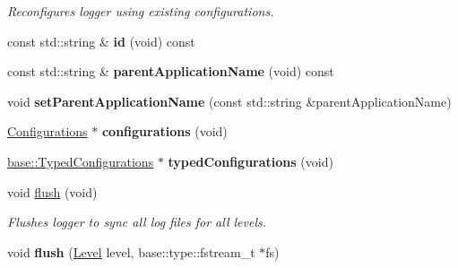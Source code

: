 \begin{DoxyCompactItemize}
\begin{DoxyCompactList}\small\item\em Reconfigures logger using existing configurations. \end{DoxyCompactList}\item 
const std\+::string \& {\bfseries id} (void) const \hypertarget{classel_1_1Logger_ae51a621df3c835f51f450134ba66f8ac}{}\label{classel_1_1Logger_ae51a621df3c835f51f450134ba66f8ac}

\item 
const std\+::string \& {\bfseries parent\+Application\+Name} (void) const \hypertarget{classel_1_1Logger_a9e56e468bccd7b52281e7bbc75892431}{}\label{classel_1_1Logger_a9e56e468bccd7b52281e7bbc75892431}

\item 
void {\bfseries set\+Parent\+Application\+Name} (const std\+::string \&parent\+Application\+Name)\hypertarget{classel_1_1Logger_a6890af8910adba26b01ef029429c4f15}{}\label{classel_1_1Logger_a6890af8910adba26b01ef029429c4f15}

\item 
\hyperlink{classel_1_1Configurations}{Configurations} $\ast$ {\bfseries configurations} (void)\hypertarget{classel_1_1Logger_aeb57aeaddbb3dcd0cb96114019817142}{}\label{classel_1_1Logger_aeb57aeaddbb3dcd0cb96114019817142}

\item 
\hyperlink{classel_1_1base_1_1TypedConfigurations}{base\+::\+Typed\+Configurations} $\ast$ {\bfseries typed\+Configurations} (void)\hypertarget{classel_1_1Logger_ac1d34e77892ea506b011d5279b6b139d}{}\label{classel_1_1Logger_ac1d34e77892ea506b011d5279b6b139d}

\item 
void \hyperlink{classel_1_1Logger_a9a89d454008b1ee1a197eec4b92ce22a}{flush} (void)\hypertarget{classel_1_1Logger_a9a89d454008b1ee1a197eec4b92ce22a}{}\label{classel_1_1Logger_a9a89d454008b1ee1a197eec4b92ce22a}

\begin{DoxyCompactList}\small\item\em Flushes logger to sync all log files for all levels. \end{DoxyCompactList}\item 
void {\bfseries flush} (\hyperlink{namespaceel_ab0ac6091262344c52dd2d3ad099e8e36}{Level} level, base\+::type\+::fstream\+\_\+t $\ast$fs)\hypertarget{classel_1_1Logger_a83c85278ebeeef6a24cc112e56c344dd}{}\label{classel_1_1Logger_a83c85278ebeeef6a24cc112e56c344dd}


\end{DoxyCompactItemize}
